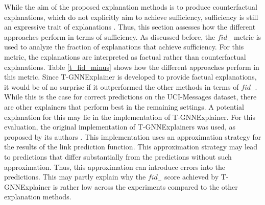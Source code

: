 While the aim of the proposed explanation methods is to produce counterfactual explanations, which do not explicitly aim to achieve sufficiency, sufficiency is still an expressive trait of explanations \cite{tan_learning_2022}. Thus, this section assesses how the different approaches perform in terms of sufficiency. As discussed before, the $fid_-$ metric is used to analyze the fraction of explanations that achieve sufficiency. For this metric, the explanations are interpreted as factual rather than counterfactual explanations. Table \ref{t_fid_minus} shows how the different approaches perform in this metric. Since T-GNNExplainer is developed to provide factual explanations, it would be of no surprise if it outperformed the other methods in terms of $fid_-$. While this is the case for correct predictions on the UCI-Messages dataset, there are other explainers that perform best in the remaining settings. A potential explanation for this may lie in the implementation of T-GNNExplainer. For this evaluation, the original implementation of T-GNNExplainers was used, as proposed by its authors \cite{xia_explaining_2023}. This implementation uses an approximation strategy for the results of the link prediction function. This approximation strategy may lead to predictions that differ substantially from the predictions without such approximation. 
Thus, this approximation can introduce errors into the predictions. This may partly explain why the $fid_-$ score achieved by T-GNNExplainer is rather low across the experiments compared to the other explanation methods.

